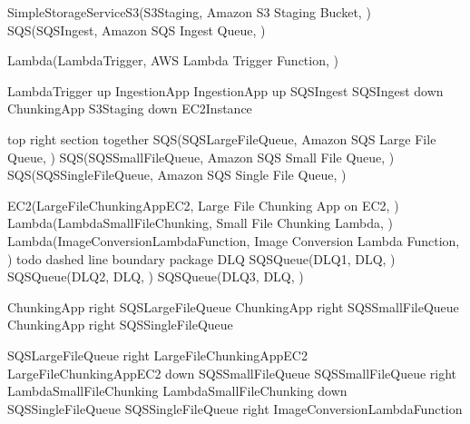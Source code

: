\documentclass[letterpaper,10pt,english]{sphinxmanual}
\begin{document}
\begin{sphinxVerbatim}[commandchars=\\\{\},numbers=left,firstnumber=1,stepnumber=1]
SimpleStorageServiceS3(S3Staging, \PYGZdq{}Amazon S3 Staging Bucket\PYGZdq{}, \PYGZdq{} \PYGZdq{})
SQS(SQSIngest, \PYGZdq{}Amazon SQS Ingest Queue\PYGZdq{}, \PYGZdq{} \PYGZdq{})

Lambda(LambdaTrigger, \PYGZdq{}AWS Lambda Trigger Function\PYGZdq{}, \PYGZdq{} \PYGZdq{})

LambdaTrigger \PYGZhy{}up\PYGZhy{}\PYGZgt{} IngestionApp
IngestionApp \PYGZhy{}up\PYGZhy{}\PYGZgt{} SQSIngest
SQSIngest \PYGZhy{}down\PYGZhy{}\PYGZgt{} ChunkingApp
S3Staging \PYGZlt{}\PYGZhy{}down\PYGZhy{}\PYGZgt{} EC2\PYGZus{}Instance

\PYGZsq{}top right section 
\PYGZsq{}\PYGZhy{}\PYGZhy{}\PYGZhy{}\PYGZhy{}\PYGZhy{}\PYGZhy{}\PYGZhy{}\PYGZhy{}\PYGZhy{}\PYGZhy{}\PYGZhy{}\PYGZhy{}\PYGZhy{}\PYGZhy{}\PYGZhy{}\PYGZhy{}\PYGZhy{}\PYGZhy{}\PYGZhy{}\PYGZhy{}\PYGZhy{}\PYGZhy{}\PYGZhy{}\PYGZhy{}\PYGZhy{}\PYGZhy{}\PYGZhy{}\PYGZhy{}\PYGZhy{}\PYGZhy{}\PYGZhy{}\PYGZhy{}\PYGZhy{}\PYGZhy{}\PYGZhy{}\PYGZhy{}\PYGZhy{}\PYGZhy{}\PYGZhy{}\PYGZhy{}\PYGZhy{}\PYGZhy{}\PYGZhy{}\PYGZhy{}\PYGZhy{}\PYGZhy{}\PYGZhy{}\PYGZhy{}\PYGZhy{}\PYGZhy{}\PYGZhy{}\PYGZhy{}\PYGZhy{}\PYGZhy{}\PYGZhy{}\PYGZhy{}\PYGZhy{}\PYGZhy{}\PYGZhy{}\PYGZhy{}\PYGZhy{}
together \PYGZob{}
SQS(SQSLargeFileQueue, \PYGZdq{}Amazon SQS Large File Queue\PYGZdq{}, \PYGZdq{} \PYGZdq{})
SQS(SQSSmallFileQueue, \PYGZdq{}Amazon SQS Small File Queue\PYGZdq{}, \PYGZdq{} \PYGZdq{})
SQS(SQSSingleFileQueue, \PYGZdq{}Amazon SQS Single File Queue\PYGZdq{}, \PYGZdq{} \PYGZdq{})

EC2(LargeFileChunkingAppEC2, \PYGZdq{}Large File Chunking App on EC2\PYGZdq{}, \PYGZdq{} \PYGZdq{})
Lambda(LambdaSmallFileChunking, \PYGZdq{}Small File Chunking Lambda\PYGZdq{}, \PYGZdq{} \PYGZdq{})
Lambda(ImageConversionLambdaFunction, \PYGZdq{}Image Conversion Lambda Function\PYGZdq{}, \PYGZdq{} \PYGZdq{})
\PYGZcb{}
\PYGZsq{}todo dashed line boundary
package DLQ \PYGZob{}
SQSQueue(DLQ1, \PYGZdq{}DLQ\PYGZdq{}, \PYGZdq{} \PYGZdq{})
SQSQueue(DLQ2, \PYGZdq{}DLQ\PYGZdq{}, \PYGZdq{} \PYGZdq{})
SQSQueue(DLQ3, \PYGZdq{}DLQ\PYGZdq{}, \PYGZdq{} \PYGZdq{})
\PYGZcb{}

ChunkingApp \PYGZhy{}right\PYGZhy{}\PYGZgt{} SQSLargeFileQueue
ChunkingApp \PYGZhy{}right\PYGZhy{}\PYGZgt{} SQSSmallFileQueue
ChunkingApp \PYGZhy{}right\PYGZhy{}\PYGZgt{} SQSSingleFileQueue

SQSLargeFileQueue \PYGZhy{}right\PYGZhy{}\PYGZgt{} LargeFileChunkingAppEC2
LargeFileChunkingAppEC2 \PYGZhy{}down\PYGZhy{}\PYGZgt{} SQSSmallFileQueue
SQSSmallFileQueue \PYGZhy{}right\PYGZhy{}\PYGZgt{} LambdaSmallFileChunking
LambdaSmallFileChunking \PYGZhy{}down\PYGZhy{}\PYGZgt{} SQSSingleFileQueue
SQSSingleFileQueue \PYGZhy{}right\PYGZhy{}\PYGZgt{} ImageConversionLambdaFunction


\end{sphinxVerbatim}
\end{document}
